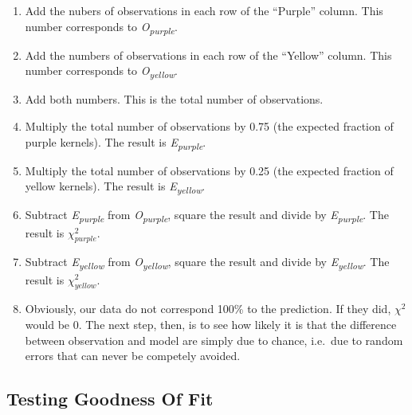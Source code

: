 \documentclass[]{book}
\providecommand{\tightlist}{%
  \setlength{\itemsep}{0pt}\setlength{\parskip}{0pt}}
\theoremstyle{definition}
\theoremstyle{definition}
\theoremstyle{definition}
\theoremstyle{remark}
\begin{document}
\begin{enumerate}
\def\labelenumi{\arabic{enumi}.}
\tightlist
\item
  Add the nubers of observations in each row of the ``Purple'' column.
  This number corresponds to \emph{O\textsubscript{purple}}.\\
\item
  Add the numbers of observations in each row of the ``Yellow'' column.
  This number corresponds to \emph{O\textsubscript{yellow}}.\\
\item
  Add both numbers. This is the total number of observations.
\item
  Multiply the total number of observations by 0.75 (the expected
  fraction of purple kernels). The result is
  \emph{E\textsubscript{purple}}.
\item
  Multiply the total number of observations by 0.25 (the expected
  fraction of yellow kernels). The result is
  \emph{E\textsubscript{yellow}}.
\item
  Subtract \emph{E\textsubscript{purple}} from
  \emph{O\textsubscript{purple}}, square the result and divide by
  \emph{E\textsubscript{purple}}. The result is \(\chi^2_{purple}\).
\item
  Subtract \emph{E\textsubscript{yellow}} from
  \emph{O\textsubscript{yellow}}, square the result and divide by
  \emph{E\textsubscript{yellow}}. The result is \(\chi^2_{yellow}\).
\item
  Obviously, our data do not correspond 100\% to the prediction. If they
  did, \(\chi^2\) would be 0. The next step, then, is to see how likely
  it is that the difference between observation and model are simply due
  to chance, i.e.~due to random errors that can never be competely
  avoided.
\end{enumerate}

\subsection{Testing Goodness Of Fit}\label{testing-goodness-of-fit}
\end{document}
